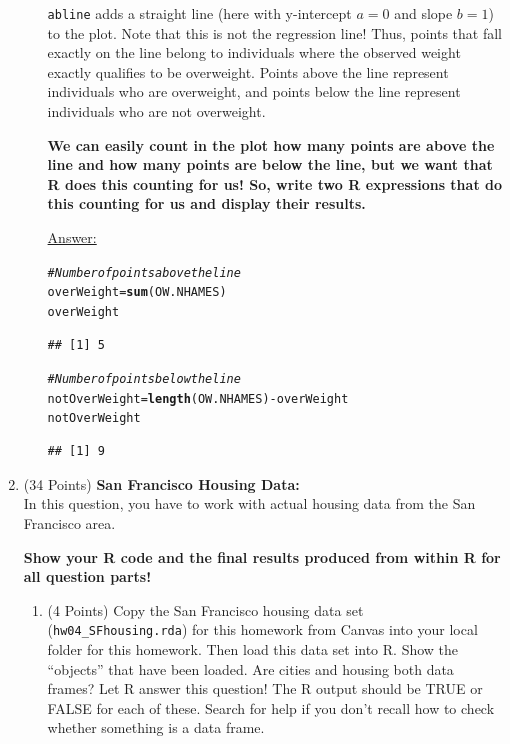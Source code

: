 \documentclass[12pt,letterpaper,final]{article}\usepackage[]{graphicx}\usepackage[]{xcolor}
\makeatletter
\newcommand{\hlcom}[1]{\textcolor[rgb]{0.678,0.584,0.686}{\textit{#1}}}%
\newcommand{\hlopt}[1]{\textcolor[rgb]{0,0,0}{#1}}%
\newcommand{\hlstd}[1]{\textcolor[rgb]{0.345,0.345,0.345}{#1}}%
\newcommand{\hlkwb}[1]{\textcolor[rgb]{0.69,0.353,0.396}{#1}}%
\newcommand{\hlkwd}[1]{\textcolor[rgb]{0.737,0.353,0.396}{\textbf{#1}}}%
\newenvironment{kframe}{%
 \def\at@end@of@kframe{}%
 \ifinner\ifhmode%
  \def\at@end@of@kframe{\end{minipage}}%
  \begin{minipage}{\columnwidth}%
 \fi\fi%
 \def\FrameCommand##1{\hskip\@totalleftmargin \hskip-\fboxsep
 \colorbox{shadecolor}{##1}\hskip-\fboxsep
     \hskip-\linewidth \hskip-\@totalleftmargin \hskip\columnwidth}%
 \MakeFramed {\advance\hsize-\width
   \@totalleftmargin\z@ \linewidth\hsize
   \@setminipage}}%
 {\par\unskip\endMakeFramed%
 \at@end@of@kframe}
\newenvironment{knitrout}{}{} %
\makeatother
\begin{document}
\begin{enumerate}
\begin{enumerate}
\verb|abline| adds a straight line (here with y-intercept $a = 0$ and slope $b = 1$) to the plot.
Note that this is not the regression line!
Thus, points that fall exactly on the line belong to individuals where the observed
weight exactly qualifies to be overweight. Points above the line represent
individuals who are overweight, and points below the line represent
individuals who are not overweight.

{\bf We can easily count in the plot how many points are above the line and how many
points are below the line, but we want that R does this counting for us! 
So, write two R expressions that do this counting for us and display their results.}

\underline{Answer:}
\begin{knitrout}
\color{fgcolor}\begin{kframe}
\begin{alltt}
\hlcom{# Number of points above the line}
\hlstd{overWeight} \hlkwb{=} \hlkwd{sum}\hlstd{(OW.NHAMES)}
\hlstd{overWeight}
\end{alltt}
\begin{verbatim}
## [1] 5
\end{verbatim}
\begin{alltt}
\hlcom{# Number of points below the line}
\hlstd{notOverWeight} \hlkwb{=} \hlkwd{length}\hlstd{(OW.NHAMES)} \hlopt{-} \hlstd{overWeight}
\hlstd{notOverWeight}
\end{alltt}
\begin{verbatim}
## [1] 9
\end{verbatim}
\end{kframe}
\end{knitrout}

\end{enumerate}


\newpage


\item (34 Points) {\bf San Francisco Housing Data:} \\
In this question, you have to work with actual housing data from the San Francisco area.

{\bf Show your R code and the final results produced from within R
for all question parts!}

\begin{enumerate}
\item (4 Points)
Copy the San Francisco housing data set (\verb|hw04_SFhousing.rda|) for this homework 
from Canvas into your local folder for this homework.
Then load this data set into R. Show the ``objects'' that have been loaded.
Are cities and housing both data frames? 
Let R answer this question!
The R output should be
TRUE or FALSE for each of these.
Search for help if you don't recall how
to check whether something is a data frame. \\


\end{enumerate}
\end{enumerate}
\end{document}
